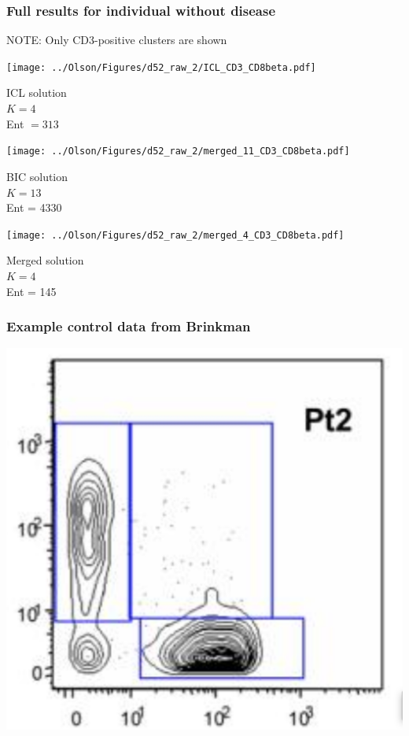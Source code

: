\documentclass[mathserif,compress]{beamer}
\renewcommand\;{\,}
\begin{document}
\begin{frame}\frametitle{Full results for individual without disease}
\alert{NOTE}: Only CD3-positive clusters are shown
\begin{center}
\begin{minipage}{0.3\linewidth}
\texttt{[image: ../Olson/Figures/d52\_raw\_2/ICL\_CD3\_CD8beta.pdf]}
\begin{center}
ICL solution
\\
$K = 4$
\\
Ent $= 313$
\end{center}
\end{minipage}
\hfill
\begin{minipage}{0.3\linewidth}
\texttt{[image: ../Olson/Figures/d52\_raw\_2/merged\_11\_CD3\_CD8beta.pdf]}
\begin{center}
BIC solution
\\
$K = 13$
\\

Ent = 4330
\end{center}
\end{minipage}
\hfill
\begin{minipage}{0.3\linewidth}
\texttt{[image: ../Olson/Figures/d52\_raw\_2/merged\_4\_CD3\_CD8beta.pdf]}
\begin{center}
Merged solution
\\
$K = 4$
\\
Ent = 145
\end{center}
\end{minipage}
\end{center}
\end{frame}

\begin{frame}\frametitle{Example control data from Brinkman}

\begin{center}
\includegraphics[width=0.7\linewidth]{Brinkman.png}
\end{center}
\end{frame}
\end{document}
